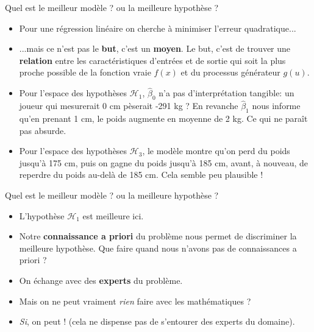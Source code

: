 \documentclass[10pt]{beamer}  %
\begin{document}
\begin{frame}{Quel est le meilleur modèle ? ou la meilleure hypothèse ?}
	\begin{itemize}
		\item Pour une régression linéaire on cherche à minimiser l'erreur quadratique...
		\pause
		\item ...mais ce n'est pas le \textbf{but}, c'est un \textbf{moyen}. Le but, c'est de trouver une \textbf{relation} entre les caractéristiques d'entrées et de sortie qui soit la plus proche possible de la fonction vraie $f(x)$ et du processus générateur $g(u)$.
		\pause
		\item Pour l'espace des hypothèses $\mathcal{H}_1$, $\hat{\beta}_0$ n'a pas d'interprétation tangible: un joueur qui mesurerait 0 cm pèserait -291 kg ? En revanche $\hat{\beta}_1$ nous informe qu'en prenant 1 cm, le poids augmente en moyenne de 2 kg. Ce qui ne paraît pas absurde.
		\pause
		\item Pour l'espace des hypothèses $\mathcal{H}_3$, le modèle montre qu'on perd du poids jusqu'à 175 cm, puis on gagne du poids jusqu'à 185 cm, avant, à nouveau, de reperdre du poids au-delà de 185 cm. Cela semble peu plausible !
	\end{itemize}
\end{frame}

\begin{frame}{Quel est le meilleur modèle ? ou la meilleure hypothèse ?}
	\begin{itemize}
		\item L'hypothèse $\mathcal{H}_1$ est meilleure ici.
		\pause
		\item Notre \textbf{connaissance a priori} du problème nous permet de discriminer la meilleure hypothèse. Que faire quand nous n'avons pas de connaissances a priori ?
		\pause
		\item On échange avec des \textbf{experts} du problème.
		\pause
		\item Mais on ne peut vraiment \textit{rien} faire avec les mathématiques ?
		\pause
		\item \textit{Si}, on peut ! (cela ne dispense pas de s'entourer des experts du domaine).
	\end{itemize}
\end{frame}
\end{document}
